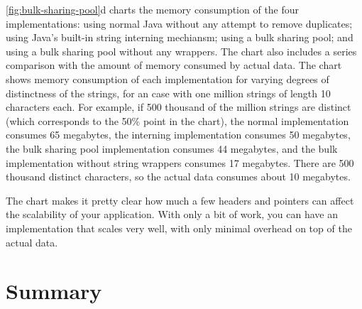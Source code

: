 \autoref{fig:bulk-sharing-pool}d charts the memory consumption of the four
implementations: using normal Java  without any attempt to remove
duplicates; using Java's built-in string interning mechiansm; using a bulk
sharing pool; and using a bulk sharing pool without any  wrappers.
The chart also includes a series comparison with the amount of memory consumed by
actual data.  The chart shows memory consumption of each implementation for
varying degrees of distinctness of the strings, for an case with one million
strings of length 10 characters each.
For example, if 500 thousand of the million strings are distinct (which
corresponds to the 50\% point in the chart), the normal implementation consumes
65 megabytes, the interning implementation consumes 50 megabytes, the bulk
sharing pool implementation consumes 44 megabytes, and the bulk implementation
without string wrappers consumes 17 megabytes. There are 500 thousand
distinct characters, so the actual data consumes about 10 megabytes.

The chart makes it pretty clear how much a few headers and pointers can affect
the scalability of your application. With only a bit of work, you can have an
implementation that scales very well, with only minimal overhead on top of the
actual data.


\section{Summary}






